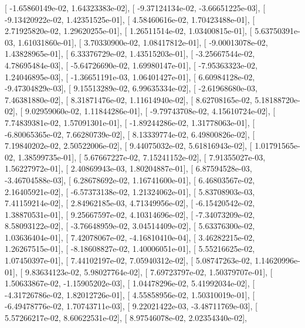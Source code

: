 \documentclass{article}
\begin{document}
       [ -1.65860149e-02,   1.64323383e-02],
       [ -9.37124134e-02,  -3.66651225e-03],
       [ -9.13420922e-02,   1.42351525e-01],
       [  4.58460616e-02,   1.70423488e-01],
       [  2.71925820e-02,   1.29620255e-01],
       [  1.26511514e-02,   1.03400815e-01],
       [  5.63750391e-03,   1.61031860e-01],
       [  3.70330900e-02,   1.08417812e-01],
       [ -9.00013078e-02,   1.43828965e-01],
       [  6.33376729e-02,   1.43515203e-01],
       [ -3.25667544e-02,   4.78695484e-03],
       [ -5.64726690e-02,   1.69980147e-01],
       [ -7.95363323e-02,   1.24046895e-03],
       [ -1.36651191e-03,   1.06401427e-01],
       [  6.60984128e-02,  -9.47304829e-03],
       [  9.15513289e-02,   6.99635334e-02],
       [ -2.61968680e-03,   7.46381880e-02],
       [  8.31871476e-02,   1.11614940e-02],
       [  8.62708165e-02,   5.18188720e-02],
       [  9.02959060e-02,   1.11844286e-01],
       [ -9.79743708e-02,   4.15610724e-02],
       [  7.74839381e-02,   1.57091301e-01],
       [ -1.89244286e-02,   1.31778063e-01],
       [ -6.80065365e-02,   7.66280739e-02],
       [  8.13339774e-02,   6.49800826e-02],
       [  7.19840202e-02,   2.50522006e-02],
       [  9.44075032e-02,   5.61816943e-02],
       [  1.01791565e-02,   1.38599735e-01],
       [  5.67667227e-02,   7.15241152e-02],
       [  7.91355027e-03,   1.56227972e-01],
       [  2.40869943e-03,   1.80204887e-01],
       [  6.87594528e-03,  -3.46704588e-03],
       [  6.28678692e-02,   1.16741600e-01],
       [  6.46803567e-02,   2.16405921e-02],
       [ -6.57373138e-02,   1.21324062e-01],
       [  5.83708903e-03,   7.41159214e-02],
       [  2.84962185e-03,   4.71349956e-02],
       [ -6.15420542e-02,   1.38870531e-01],
       [  9.25667597e-02,   4.10314696e-02],
       [ -7.34073209e-02,   8.58093122e-02],
       [ -3.76648959e-02,   3.04514409e-02],
       [  5.63376300e-02,   1.03636404e-01],
       [  7.42078067e-02,  -4.16810410e-04],
       [  3.46282215e-02,   1.26267515e-01],
       [ -8.18608827e-02,   1.40006051e-01],
       [  5.55216625e-02,   1.07450397e-01],
       [  7.44102197e-02,   7.05940312e-02],
       [  5.08747263e-02,   1.14620996e-01],
       [  9.83634123e-02,   5.98027764e-02],
       [  7.69723797e-02,   1.50379707e-01],
       [  1.50633867e-02,  -1.15905202e-03],
       [  1.04478296e-02,   5.41992034e-02],
       [ -4.31726786e-02,   1.82012726e-01],
       [  4.55858956e-02,   1.50310019e-01],
       [ -6.49478776e-02,   1.70743711e-03],
       [  9.22021422e-03,  -3.48711769e-03],
       [  5.57266217e-02,   8.60622531e-02],
       [  8.97546078e-02,   2.02354340e-02],
\end{document}
